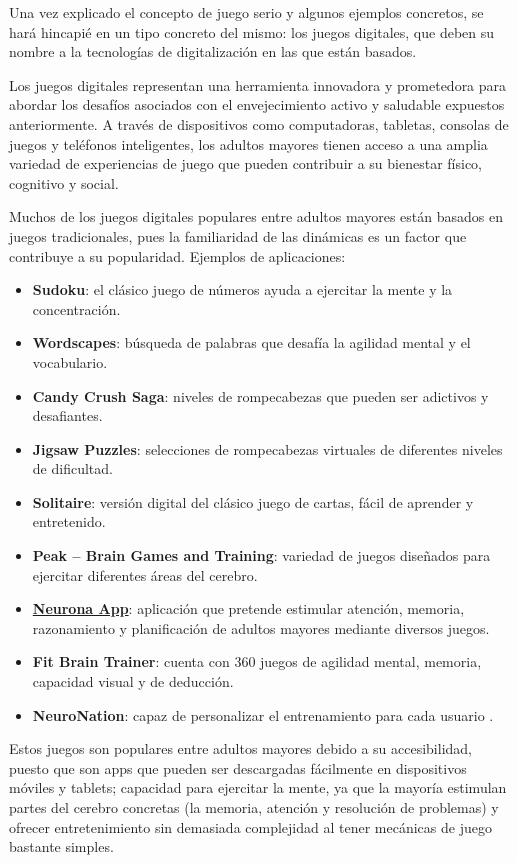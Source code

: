 Una vez explicado el concepto de juego serio y algunos ejemplos concretos, se hará hincapié en un tipo concreto del mismo: los juegos digitales, que deben su nombre a la tecnologías de digitalización en las que están basados.

Los juegos digitales representan una herramienta innovadora y prometedora para abordar los desafíos asociados con el envejecimiento activo y saludable expuestos anteriormente. A través de dispositivos como computadoras, tabletas, consolas de juegos y teléfonos inteligentes, los adultos mayores tienen acceso a una amplia variedad de experiencias de juego que pueden contribuir a su bienestar físico, cognitivo y social.

Muchos de los juegos digitales populares entre adultos mayores están basados en juegos tradicionales, pues la familiaridad de las dinámicas es un factor que contribuye a su popularidad. Ejemplos de aplicaciones:
\begin{itemize}[leftmargin=1.5cm, topsep=2.2pt, itemsep=0.4pt]
    \item \textbf{Sudoku}: el clásico juego de números ayuda a ejercitar la mente y la concentración.
    \item \textbf{Wordscapes}: búsqueda de palabras que desafía la agilidad mental y el vocabulario.
    \item \textbf{Candy Crush Saga}: niveles de rompecabezas que pueden ser adictivos y desafiantes.
    \item \textbf{Jigsaw Puzzles}: selecciones de rompecabezas virtuales de diferentes niveles de dificultad.
    \item \textbf{Solitaire}: versión digital del clásico juego de cartas, fácil de aprender y entretenido.
    \item \textbf{Peak – Brain Games and Training}: variedad de juegos diseñados para ejercitar diferentes áreas del cerebro.
    \item \textbf{\href{https://neuronapp.com.mx/inicio}{Neurona App}}: aplicación que pretende estimular atención, memoria, razonamiento y planificación de adultos mayores mediante diversos juegos.
    \item \textbf{Fit Brain Trainer}: cuenta con 360 juegos de agilidad mental, memoria, capacidad visual y de deducción.
    \item \textbf{NeuroNation}: capaz de personalizar el entrenamiento para cada usuario \parencite{juegosMem1}.
\end{itemize}

Estos juegos son populares entre adultos mayores debido a su accesibilidad, puesto que son apps que pueden ser descargadas fácilmente en dispositivos móviles y tablets; capacidad para ejercitar la mente, ya que la mayoría estimulan partes del cerebro concretas (la memoria, atención y resolución de problemas) y ofrecer entretenimiento sin demasiada complejidad al tener mecánicas de juego bastante simples.

